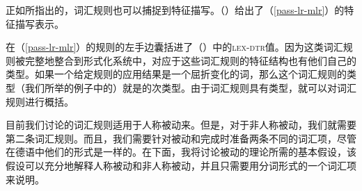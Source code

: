 正如\citet{Meurers2001a}所指出的，词汇规则也可以捕捉到特征描写。\label{pageref-lr-mit-dtr}（）给出了（\ref{pass-lr-mlr}）的特征描写表示。
\begin{figure}
\ea
\label{passiv-lr-mit-dtr}
\z
\vspace{-\baselineskip}
\end{figure}%
在（\ref{pass-lr-mlr}）的规则的左手边囊括进了（）中的\textsc{lex-dtr}值。因为这类词汇规则被完整地整合到形式化系统中，对应于这些词汇规则的特征结构也有他们自己的类型。如果一个给定规则的应用结果是一个屈折变化的词，那么这个词汇规则的类型（我们所举的例子中的）就是的次类型。由于词汇规则具有类型，就可以对词汇规则进行概括。

目前我们讨论的词汇规则适用于人称被动来。但是，对于非人称被动，我们就需要第二条词汇规则。而且，我们需要针对被动和完成时准备两条不同的词汇项，尽管在德语中他们的形式是一样的。在下面，我将讨论被动的理论所需的基本假设，该假设可以充分地解释人称被动和非人称被动，并且只需要用分词形式的一个词汇项来说明。

